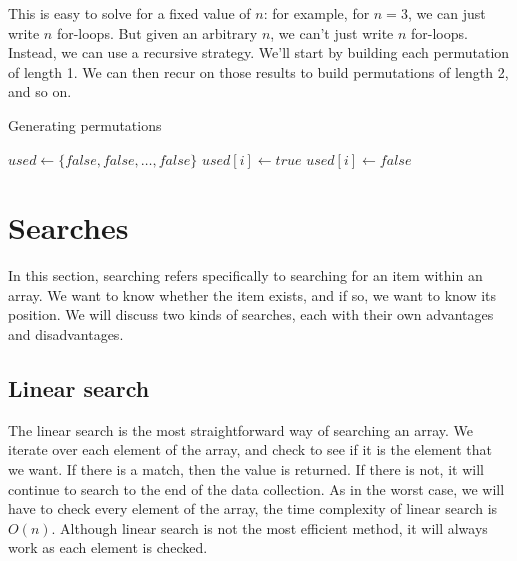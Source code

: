 \noindent This is easy to solve for a fixed value of $n$: for example, for $n=3$, we can just write $n$ for-loops. But given an arbitrary $n$, we can't just write $n$ for-loops. Instead, we can use a recursive strategy. We'll start by building each permutation of length 1. We can then recur on those results to build permutations of length 2, and so on.


\begin{algorithm}[H]
\caption{Generating permutations}
\begin{algorithmic}

\State $used \gets \{false, false, \ldots, false\}$
        \State {}
        \State \Return
    \EndIf
            \State $used[i] \gets true$
            \State {}
            \State $used[i] \gets false$
        \EndIf
    \EndFor
\EndFunction

\end{algorithmic}
\end{algorithm}


\section{Searches}

In this section, searching refers specifically to searching for an item within an array. We want to know whether the item exists, and if so, we want to know its position. We will discuss two kinds of searches, each with their own advantages and disadvantages.

\subsection{Linear search}

The linear search is the most straightforward way of searching an array.  We iterate over each element of the array, and check to see if it is the element that we want. If there is a match, then the value is returned. If there is not, it will continue to search to the end of the data collection. As in the worst case, we will have to check every element of the array, the time complexity of linear search is $ O(n) $.  Although linear search is not the most efficient method, it will always work as each element is checked.

